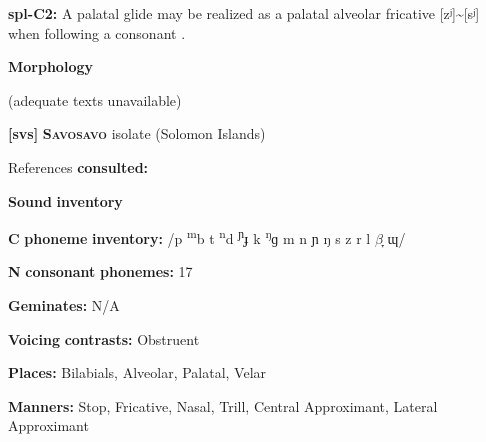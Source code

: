 \begin{styleBody}
\textbf{spl-C2:} A palatal glide may be realized as a palatal alveolar fricative [zʲ]{\textasciitilde}[sʲ] when following a consonant \citep{McElhanon1970}.
\end{styleBody}

\begin{styleBody}
\textbf{Morphology}
\end{styleBody}

\begin{styleBody}
(adequate texts unavailable)
\end{styleBody}

\begin{styleBody}
\textbf{[svs]}   \textbf{\textsc{Savosavo}}  isolate (Solomon Islands)
\end{styleBody}

\begin{styleBody}
References \textbf{consulted:} \citet{Wegener2008}
\end{styleBody}

\begin{styleBody}
\textbf{Sound} \textbf{inventory}
\end{styleBody}

\begin{styleBody}
\textbf{C} \textbf{phoneme} \textbf{inventory:} /p \textsuperscript{m}b t \textsuperscript{n}d \textsuperscript{ɲ}ɟ k \textsuperscript{ŋ}ɡ m n ɲ ŋ s z r l $\beta ̞$ ɰ/
\end{styleBody}

\begin{styleBody}
\textbf{N} \textbf{consonant} \textbf{phonemes:} 17
\end{styleBody}

\begin{styleBody}
\textbf{Geminates:} N/A
\end{styleBody}

\begin{styleBody}
\textbf{Voicing} \textbf{contrasts:} Obstruent
\end{styleBody}

\begin{styleBody}
\textbf{Places:} Bilabials, Alveolar, Palatal, Velar
\end{styleBody}

\begin{styleBody}
\textbf{Manners:} Stop, Fricative, Nasal, Trill, Central Approximant, Lateral Approximant
\end{styleBody}

